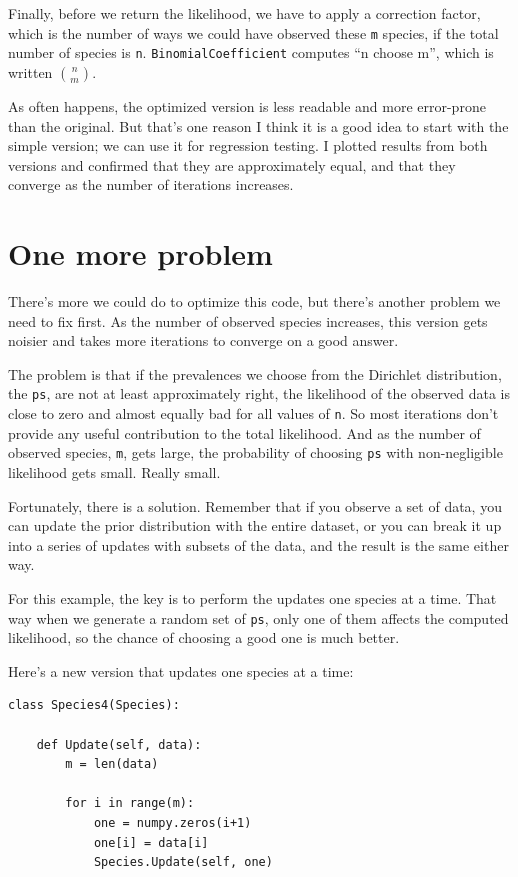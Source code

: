 \documentclass[12pt]{book}
\begin{document}
Finally, before we return the likelihood, we have to apply a correction
factor, which is the number of ways we could have observed these {\tt m}
species, if the total number of species is {\tt n}.  
{\tt BinomialCoefficient} computes ``n choose m'', which is written
$\binom{n}{m}$. 

As often happens, the optimized version is less readable and more
error-prone than the original.  But that's one reason I think it is
a good idea to start with the simple version; we can use it for
regression testing.  I plotted results from both versions and confirmed
that they are approximately equal, and that they converge as the
number of iterations increases.


\section{One more problem}

There's more we could do to optimize this code, but there's another
problem we need to fix first.  As the number of observed
species increases, this version gets noisier and takes more
iterations to converge on a good answer.

The problem is that if the prevalences we choose from the Dirichlet
distribution, the {\tt ps}, are not at least approximately right,
the likelihood of the observed data is close to zero and almost
equally bad for all values of {\tt n}.  So most iterations don't
provide any useful contribution to the total likelihood.  And as the
number of observed species, {\tt m}, gets large, the probability of
choosing {\tt ps} with non-negligible likelihood gets small.  Really
small.

Fortunately, there is a solution.  Remember that if you observe
a set of data, you can update the prior distribution with the
entire dataset, or you can break it up into a series of updates
with subsets of the data, and the result is the same either way.

For this example, the key is to perform the updates one species at
a time.  That way when we generate a random set of {\tt ps}, only
one of them affects the computed likelihood, so the chance of choosing
a good one is much better.

Here's a new version that updates one species at a time:

\begin{verbatim}
class Species4(Species):

    def Update(self, data):
        m = len(data)

        for i in range(m):
            one = numpy.zeros(i+1)
            one[i] = data[i]            
            Species.Update(self, one)
\end{verbatim}
\end{document}
